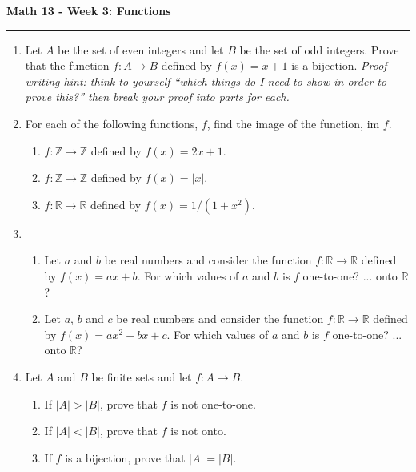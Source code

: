 \documentclass[12pt]{report}
\theoremstyle{definition}
\newcommand{\integers}{\mathbb{Z}}
\newcommand{\reals}{\mathbb{R}}
\begin{document}
\begin{center}
{\bf \Large Math 13 - Week 3: Functions}
\vspace{0.2cm}
\hrule
\end{center}

\begin{enumerate}	



	\item Let $A$ be the set of even integers and let $B$ be the set of odd integers. Prove that the function $f: A\to B$ defined by $f(x) = x+1$ is a bijection. \textit{Proof writing hint: think to yourself ``which things do I need to show in order to prove this?'' then break your proof into parts for each.}

	\vfill

	\item For each of the following functions, $f$, find the image of the function, im $f$.
	\begin{enumerate}
		\item $f: \integers\to \integers$ defined by $f(x) = 2x+1$.
		\item $f: \integers \to \integers$ defined by $f(x)=|x|$.
		\item $f: \reals \to \reals$ defined by $f(x) = 1/(1+x^2)$.
	\end{enumerate}

	\vfill

	\item
	\begin{enumerate}
		\item Let $a$ and $b$ be real numbers and consider the function $f: \reals \to \reals$ defined by $f(x) = ax+b$. For which values of $a$ and $b$ is $f$ one-to-one? ... onto $\reals$?

		\item Let $a$, $b$ and $c$ be real numbers and consider the function $f: \reals \to \reals$ defined by $f(x) = ax^2+bx+c$. For which values of $a$ and $b$ is $f$ one-to-one? ... onto $\reals$?
	\end{enumerate}

	\vfill

	\item Let $A$ and $B$ be finite sets and let $f: A\to B$.
	\begin{enumerate}
		\item If $|A|>|B|$, prove that $f$ is not one-to-one.
		\item If $|A|<|B|$, prove that $f$ is not onto.
		\item If $f$ is a bijection, prove that $|A| = |B|$.
	\end{enumerate}

	\vfill

\end{enumerate}
\end{document}

